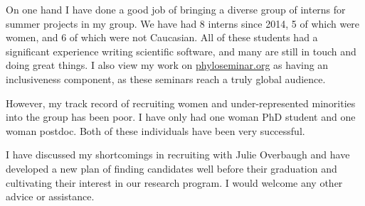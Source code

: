 \documentclass[nobib]{tufte-handout}
\begin{document}
On one hand I have done a good job of bringing a diverse group of interns for summer projects in my group.
We have had 8 interns since 2014, 5 of which were women, and 6 of which were not Caucasian.
All of these students had a significant experience writing scientific software, and many are still in touch and doing great things.
I also view my work on \href{http://phyloseminar.org/}{phyloseminar.org} as having an inclusiveness component, as these seminars reach a truly global audience.

However, my track record of recruiting women and under-represented minorities into the group has been poor.
I have only had one woman PhD student and one woman postdoc.
Both of these individuals have been very successful.

I have discussed my shortcomings in recruiting with Julie Overbaugh and have developed a new plan of finding candidates well before their graduation and cultivating their interest in our research program.
I would welcome any other advice or assistance.
\end{document}
